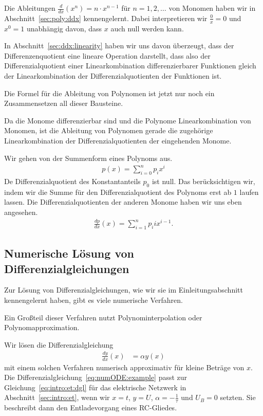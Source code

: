 \documentclass{article}
\def\ddx#1{\frac{d#1}{dx}}
\begin{document}
Die Ableitungen $\ddx{}\left(x^n\right) = n\cdot x^{n-1}$ für
$n=1,2,\ldots$ von Monomen haben wir in Abschnitt~\ref{sec:poly:ddx}
kennengelernt. Dabei interpretieren wir $\frac{0}{x}=0$ und $x^0 = 1$
unabhängig davon, dass $x$ auch null werden kann.

In Abschnitt~\ref{sec:ddx:linearity} haben wir uns davon überzeugt,
dass der Differenzenquotient eine lineare Operation darstellt, dass
also der Differenzialquotient einer Linearkombination
differenzierbarer Funktionen gleich der Linearkombination der
Differenzialquotienten der Funktionen ist.

Die Formel für die Ableitung von Polynomen ist jetzt nur noch ein
Zusammensetzen all dieser Bausteine.

Da die Monome differenzierbar sind und die Polynome Linearkombination
von Monomen, ist die Ableitung von Polynomen gerade die zugehörige
Linearkombination der Differenzialquotienten der eingehenden Monome.

Wir gehen von der Summenform eines Polynoms aus.
\begin{align*}
  p(x) = \sum_{i=0}^n p_i x^i
\end{align*}
De Differenzialquotient des Konstantanteils $p_0$ ist null. Das
berücksichtigen wir, indem wir die Summe für den Differenzialquotient
des Polynoms erst ab $1$ laufen lassen. Die Differenzialquotienten der
anderen Monome haben wir uns eben angesehen.
\begin{align*}
  \ddx p(x) = \sum_{i=1}^n p_i i x^{i-1}.
\end{align*}
\subsection{Numerische Lösung von Differenzialgleichungen}
\label{sec:numODE}
Zur Lösung von Differenzialgleichungen, wie wir sie im
Einleitungsabschnitt kennengelernt haben, gibt es viele numerische
Verfahren.

Ein Großteil dieser Verfahren nutzt Polynominterpolation oder
Polynomapproximation.

Wir lösen die Differenzialgleichung
\begin{align}
  \ddx y(x) &= \alpha y(x)
              \label{eq:numODE:example}
\end{align}
mit einem solchen Verfahren numerisch approximativ für kleine Beträge
von $x$. Die Differenzialgleichung~\eqref{eq:numODE:example} passt zur
Gleichung~\eqref{eq:intro:et:dgl} für das elektrische Netzwerk in
Abschnitt~\ref{sec:intro:et}, wenn wir $x=t$, $y=U$,
$\alpha=-\frac1\tau$ und $U_B=0$ setzten. Sie beschreibt dann den
Entladevorgang eines RC-Gliedes.
\end{document}
